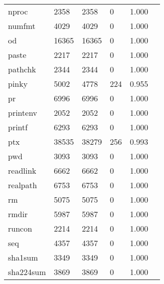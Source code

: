 \begin{longtable}{lp{2.40cm}p{2.40cm}p{2.40cm}p{2.40cm}p{2.40cm}}
nproc     &                     2358 &         2358 &             0 &                    1.000 \\
numfmt    &                     4029 &         4029 &             0 &                    1.000 \\
od        &                    16365 &        16365 &             0 &                    1.000 \\
paste     &                     2217 &         2217 &             0 &                    1.000 \\
pathchk   &                     2344 &         2344 &             0 &                    1.000 \\
pinky     &                     5002 &         4778 &           224 &                    0.955 \\
pr        &                     6996 &         6996 &             0 &                    1.000 \\
printenv  &                     2052 &         2052 &             0 &                    1.000 \\
printf    &                     6293 &         6293 &             0 &                    1.000 \\
ptx       &                    38535 &        38279 &           256 &                    0.993 \\
pwd       &                     3093 &         3093 &             0 &                    1.000 \\
readlink  &                     6662 &         6662 &             0 &                    1.000 \\
realpath  &                     6753 &         6753 &             0 &                    1.000 \\
rm        &                     5075 &         5075 &             0 &                    1.000 \\
rmdir     &                     5987 &         5987 &             0 &                    1.000 \\
runcon    &                     2214 &         2214 &             0 &                    1.000 \\
seq       &                     4357 &         4357 &             0 &                    1.000 \\
sha1sum   &                     3349 &         3349 &             0 &                    1.000 \\
sha224sum &                     3869 &         3869 &             0 &                    1.000 \\

\end{longtable}
